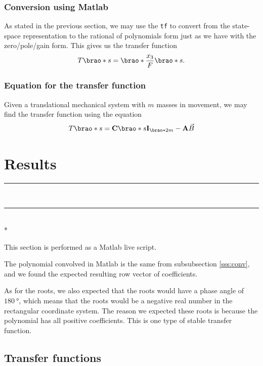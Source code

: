 \documentclass[12pt]{article}
\DeclarePairedDelimiter\brao()%
\def\hr{{\par\noindent\rule{\textwidth}{0.4pt}}}
\begin{document}
\subsubsection{Conversion using Matlab}

As stated in the previous section,
we may use the \texttt{tf} to convert from the state-space representation to the rational of polynomials form
just as we have with the zero/pole/gain form.
This gives us the transfer function
\begin{equation}
    T\brao*s = \brao*{\frac{x_3}{F}}\brao*s.
\end{equation}

\subsubsection{Equation for the transfer function}

Given a translational mechanical system with $m$ masses in movement,
we may find the transfer function using the equation
\begin{equation}
    T\brao*s = \mathbf{C}\brao*{s\mathbf{I}_{\brao*{2m}} - \mathbf{A}}\vec{B}
\end{equation}



\section{Results}

\hr



\ \hr \\*

This section is performed as a Matlab live script.

The polynomial convolved in Matlab is the same from subsubsection \ref{sss:conv}, and we found the expected resulting row vector of coefficients.

As for the roots, we also expected that the roots would have a phase angle of $\SI{180}\degree$,
which means that the roots would be a negative real number in the rectangular coordinate system.
The reason we expected these roots is because the polynomial has all positive coefficients.
This is one type of stable transfer function.

\subsection{Transfer functions}
\end{document}
